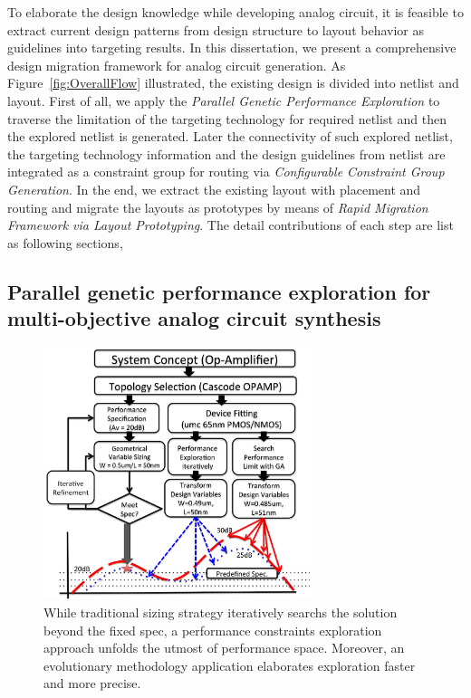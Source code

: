     To elaborate the design knowledge while developing analog circuit, it is feasible to extract current design patterns from design structure to layout behavior as guidelines into targeting results. In this dissertation, we present a comprehensive design migration framework for analog circuit generation. As Figure~\ref{fig:OverallFlow} illustrated, the existing design is divided into netlist and layout. First of all, we apply the {\it Parallel Genetic Performance Exploration} to traverse the limitation of the targeting technology for required netlist and then the explored netlist is generated. Later the connectivity of such explored netlist, the targeting technology information and the design guidelines from netlist are integrated as a constraint group for routing via {\it Configurable Constraint Group Generation}. In the end, we extract the existing layout with placement and routing and migrate the layouts as prototypes by means of {\it Rapid Migration Framework via Layout Prototyping}. The detail contributions of each step are list as following sections,

   

    

    \subsection{Parallel genetic performance exploration for multi-objective analog circuit synthesis}\label{subsec:PAGEContribute}

      \begin{figure}[ht]
        \centerline{
        \includegraphics[width=0.7\textwidth]{Fig/Introduction/PerfCons.eps}}
        \caption{While traditional sizing strategy iteratively searchs the solution beyond the fixed spec, a performance constraints exploration approach unfolds the utmost of performance space. Moreover, an evolutionary methodology application elaborates exploration faster and more precise.} 
        \label{fig:PerfOptimal}
      \end{figure}

